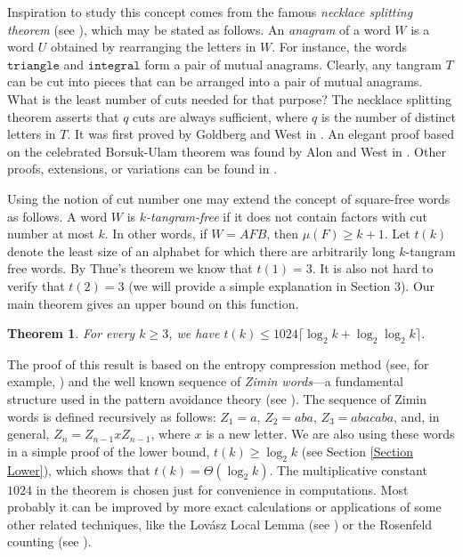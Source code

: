 \documentclass[12pt]{amsart}
\newtheorem{theorem}{Theorem}
\theoremstyle{plain}
\numberwithin{equation}{section}
\begin{document}
Inspiration to study this concept comes from the famous \emph{necklace splitting theorem} (see \cite{Matousek}), which may be stated as follows. An \emph{anagram} of a word $W$ is a word $U$ obtained by rearranging the letters in $W$. For instance, the words $\mathtt{triangle}$ and $\mathtt{integral}$ form a pair of mutual anagrams. Clearly, any tangram $T$ can be cut into pieces that can be arranged into a pair of mutual anagrams. What is the least number of cuts needed for that purpose? The necklace splitting theorem asserts that $q$ cuts are always sufficient, where $q$ is the number of distinct letters in $T$. It was first proved by Goldberg and West in \cite{Goldberg-West}. An elegant proof based on the celebrated Borsuk-Ulam theorem was found by Alon and West in \cite{Alon-West}. Other proofs, extensions, or variations can be found in \cite{Alon,AlonGML,GrytczukLubawski,JoicPZ,Lason,DeLonguevilleZivaljevic,VrecicaZivaljevic}.

Using the notion of cut number one may extend the concept of square-free words as follows. A word $W$ is \emph{$k$-tangram-free} if it does not contain factors with cut number at most $k$. In other words, if $W=AFB$, then $\mu(F)\geqslant k+1$. Let $t(k)$ denote the least size of an alphabet for which there are arbitrarily long $k$-tangram free words. By Thue's theorem \cite{Thue} we know that $t(1)=3$. It is also not hard to verify that $t(2)=3$ (we will provide a simple explanation in Section 3). Our main theorem gives an upper bound on this function.

\begin{theorem}\label{Theorem Jajko}
	For every $k\geqslant 3$, we have $t(k) \leqslant 1024\lceil\log_2 k + \log_2\log_2 k\rceil$.
\end{theorem}

The proof of this result is based on the entropy compression method (see, for example, \cite{BosekGNZ,GrytczukKM}) and the well known sequence of \emph{Zimin words}---a fundamental structure used in the pattern avoidance theory (see \cite{BeanEM,LothaireAlgebraic}). The sequence of Zimin words is defined recursively as follows: $Z_1=a$, $Z_2=aba$, $Z_3=abacaba$, and, in general, $Z_n=Z_{n-1}xZ_{n-1}$, where $x$ is a new letter. We are also using these words in a simple proof of the lower bound, $t(k)\geqslant \log_2k$ (see Section \ref{Section Lower}), which shows that $t(k)=\Theta(\log_2k)$. The multiplicative constant $1024$ in the theorem is chosen just for convenience in computations. Most probably it can be improved by more exact calculations or applications of some other related techniques, like the Lov\'{a}sz Local Lemma (see \cite{AlonSpencer}) or the Rosenfeld counting (see \cite{Rosenfeld1,Rosenfeld2}).
\end{document}
